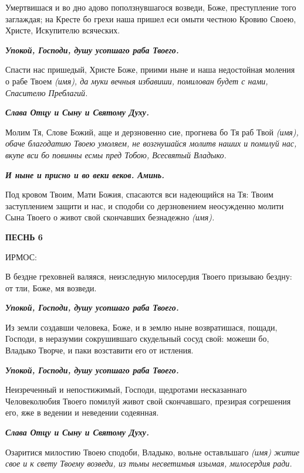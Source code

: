 Умертвишася и во дно адово поползнувшагося возведи, Боже, преступление того заглаждая; на Кресте бо грехи наша пришел еси омыти честною Кровию Своею, Христе, Искупителю всяческих.


\itshape \bfseries Упокой, Господи, душу усопшаго раба Твоего.\normalfont{}\normalfont{}


Спасти нас пришедый, Христе Боже, приими ныне и наша недостойная моления о рабе Твоем \itshape (имя)\normalfont{}, да муки вечныя избавиши, помилован будет с нами, Спасителю Преблагий.


\itshape \bfseries Слава Отцу и Сыну и Святому Духу.\normalfont{}\normalfont{}


Молим Тя, Слове Божий, аще и дерзновенно сие, прогнева бо Тя раб Твой \itshape (имя)\normalfont{}, обаче благодатию Твоею умоляем, не возгнушайся молитв наших и помилуй нас, вкупе вси бо повинны есмы пред Тобою, Всесвятый Владыко.


\itshape \bfseries И ныне и присно и во веки веков. Аминь.\normalfont{}\normalfont{}


Под кровом Твоим, Мати Божия, спасаются вси надеющийся на Тя: Твоим заступлением защити и нас, и сподоби со дерзновением неосужденно молити Сына Твоего о живот свой скончавших безнадежно \itshape (имя)\normalfont{}. 


\bfseries ПЕСНЬ 6


ИРМОС:\normalfont{}


В бездне греховней валяяся, неизследную милосердия Твоего призываю бездну: от тли, Боже, мя возведи.


\itshape \bfseries Упокой, Господи, душу усопшаго раба Твоего.\normalfont{}\normalfont{}


Из земли создавши человека, Боже, и в землю ныне возвратишася, пощади, Господи, в неразумии сокрушившаго скудельный сосуд свой: можеши бо, Владыко Творче, и паки возставити его от истления.


\itshape \bfseries Упокой, Господи, душу усопшаго раба Твоего.\normalfont{}\normalfont{}


Неизреченный и непостижимый, Господи, щедротами несказаннаго Человеколюбия Твоего помилуй живот свой скончавшаго, презирая согрешения его, яже в ведении и неведении содеянная.


\itshape \bfseries Слава Отцу и Сыну и Святому Духу.\normalfont{}\normalfont{}


Озаритися милостию Твоею сподоби, Владыко, вольне оставльшаго \itshape (имя)\normalfont{} житие свое и к свету Твоему возведи, из тьмы несветимыя изымая, милосердия ради.


